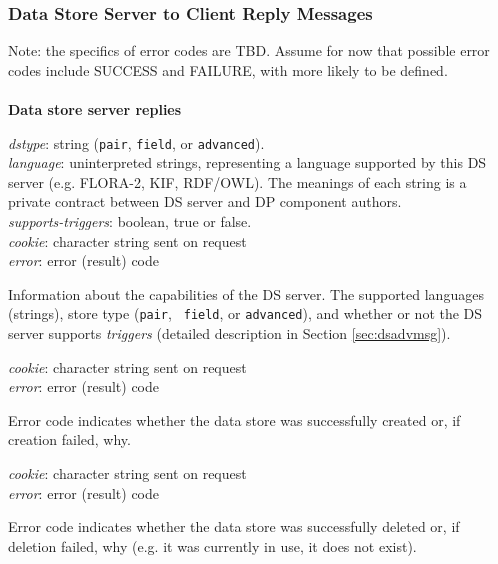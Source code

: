 
\subsubsection{Data Store Server to Client Reply Messages}

Note: the specifics of error codes are TBD. Assume for now that
possible error codes include SUCCESS and FAILURE, with more likely to
be defined. 

\paragraph {}
{\bf Data store server replies}

{
\metP
    {\em dstype}: string ({\tt pair}, {\tt field}, or {\tt advanced}).\\
    {\em language}: uninterpreted strings, representing a language
    supported by this DS server (e.g. FLORA-2, KIF,
    RDF/OWL). The meanings of each string is a private contract
    between DS server and DP component authors.\\
    {\em supports-triggers}: boolean, true or false.\\
    {\em cookie}: character string sent on request\\
    {\em error}: error (result) code

\metD
    Information about the capabilities of the DS server.
    The supported languages (strings), store type ({\tt pair}, {\tt
    field}, or {\tt advanced}), and whether or not 
    the DS server supports {\em triggers} (detailed description in
    Section \ref{sec:dsadvmsg}).
}

{
\metP
    {\em cookie}: character string sent on request\\
    {\em error}: error (result) code

\metD
    Error code indicates whether the data store was successfully
    created or, if creation failed, why.
}


{
\metP
    {\em cookie}: character string sent on request\\
    {\em error}: error (result) code

\metD
    Error code indicates whether the data store was successfully
    deleted or, if deletion failed, why (e.g. it was currently in use, 
    it does not exist).
}

